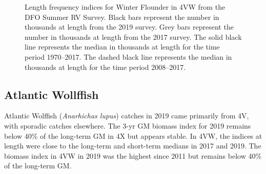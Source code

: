 \documentclass[11pt]{book}
\begin{document}
\begin{figure}[htb]

{\centering {} 

}

\caption{Length frequency indices for Winter Flounder in 4VW from the DFO Summer RV Survey. Black bars represent the number in thousands at length from the 2019 survey. Grey bars represent the number in thousands at length from the 2017 survey. The solid black line represents the median in thousands at length for the time period 1970--2017. The dashed black line represents the median in thousands at length for the time period 2008--2017.}\label{fig:64-fig-winterflounder-lengthfreq4VW}
\end{figure}
\clearpage

\hypertarget{atlantic-wollffish}{%
\subsection{Atlantic Wollffish}\label{atlantic-wollffish}}

Atlantic Wolffish (\emph{Anarhichas lupus}) catches in 2019 came primarily from 4V, with sporadic catches elsewhere. The 3-yr GM biomass index for 2019 remains below 40\% of the long-term GM in 4X but appears stable. In 4VW, the indices at length were close to the long-term and short-term medians in 2017 and 2019. The biomass index in 4VW in 2019 was the highest since 2011 but remains below 40\% of the long-term GM.
\end{document}

